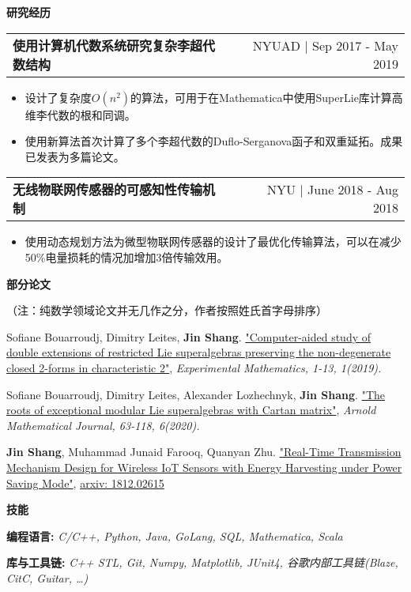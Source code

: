 \documentclass[letterpaper,11pt]{article}
\makeatletter
\newcommand{\resitem}[1]{\item  #1}
\newcommand{\resheading}[1]{{\large \colorbox{mygrey}{\begin{minipage}{\linewidth}{\textbf{#1 \vphantom{p\^{E}}}}\end{minipage}}}}
\newcommand{\ressubsubheading}[2]{
\begin{tabular*}{1.04\linewidth}{l@{\extracolsep{\fill}}r}
	\textbf{#1} & #2 \\
\end{tabular*}\vspace{-6pt}}
\makeatother
\begin{document}
\resheading{研究经历}
	\begin{description}
		\item 
			\ressubsubheading{使用计算机代数系统研究复杂李超代数结构}{NYUAD $|$ Sep 2017 - May 2019}
				{ \footnotesize
				\begin{itemize}
					\resitem{设计了复杂度$O(n^2)$的算法，可用于在Mathematica中使用SuperLie库计算高维李代数的根和同调。}
					\resitem{使用新算法首次计算了多个李超代数的Duflo-Serganova函子和双重延拓。成果已发表为多篇论文。}
				\end{itemize}
				}
		\item
			\ressubsubheading{无线物联网传感器的可感知性传输机制}{NYU $|$ June 2018 - Aug 2018}
				{ \footnotesize
				\begin{itemize}
					\resitem{使用动态规划方法为微型物联网传感器的设计了最优化传输算法，可以在减少50\%电量损耗的情况加增加3倍传输效用。}
				\end{itemize}
				}

	\end{description}  %
\resheading{部分论文}
\footnotesize（注：纯数学领域论文并无几作之分，作者按照姓氏首字母排序）
\begin{description}
	\item \footnotesize Sofiane Bouarroudj, Dimitry Leites, \textbf{Jin Shang}. \href{https://arxiv.org/abs/1904.09579}{"Computer-aided study of double extensions of restricted Lie superalgebras preserving the non-degenerate closed 2-forms in characteristic 2"}, \textit{Experimental Mathematics, 1-13, 1(2019).} 
	\item \footnotesize Sofiane Bouarroudj, Dimitry Leites, Alexander Lozhechnyk, \textbf{Jin Shang}. \href{https://arxiv.org/abs/1904.09578}{"The roots of exceptional modular Lie superalgebras with Cartan matrix"}, \textit{Arnold Mathematical Journal, 63-118, 6(2020).} 
	\item \footnotesize  \textbf{Jin Shang}, Muhammad Junaid Farooq, Quanyan Zhu. \href{https://arxiv.org/abs/1812.02615}{"Real-Time Transmission Mechanism Design for Wireless IoT Sensors with Energy Harvesting under Power Saving Mode"}, \href{https://arxiv.org/abs/1812.02615}{arxiv: 1812.02615}
\end{description}
\resheading{技能}
\begin{description}
	\item \footnotesize \textbf{编程语言:} \textit{C/C++, Python, Java, GoLang,  SQL, Mathematica, Scala}
	\item \footnotesize \textbf{库与工具链:} \textit{C++ STL, Git, Numpy, Matplotlib, JUnit4, 谷歌内部工具链(Blaze, CitC, Guitar, \dots)}
\end{description}
\end{document}

